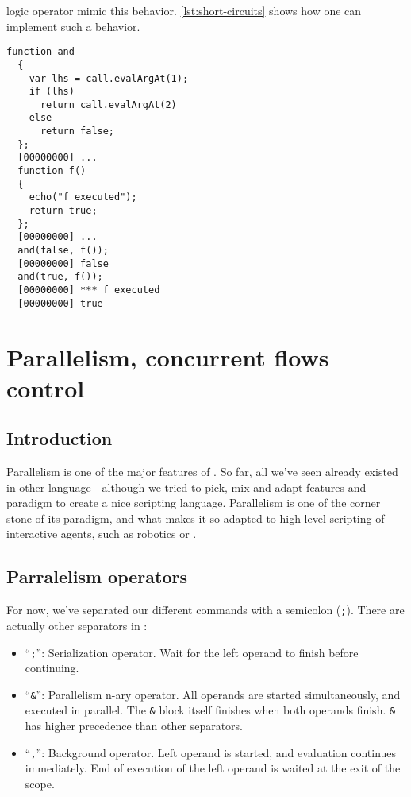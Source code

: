\documentclass[openright,twoside,12pt]{report}
\begin{document}
\urbi logic operator mimic this behavior. \autoref{lst:short-circuits} shows
how one can implement such a behavior.

\begin{lstlisting}[caption=Implementing logic short circuits,
  label=lst:short-circuits]
  function and
  {
    var lhs = call.evalArgAt(1);
    if (lhs)
      return call.evalArgAt(2)
    else
      return false;
  };
  [00000000] ...
  function f()
  {
    echo("f executed");
    return true;
  };
  [00000000] ...
  and(false, f());
  [00000000] false
  and(true, f());
  [00000000] *** f executed
  [00000000] true
\end{lstlisting}


\chapter{Parallelism, concurrent flows control}

\section{Introduction}

Parallelism is one of the major features of \urbi. So far, all we've
seen already existed in other language - although we tried to pick,
mix and adapt features and paradigm to create a nice scripting
language. Parallelism is one of the corner stone of its paradigm, and
what makes it so adapted to high level scripting of interactive
agents, such as robotics or \ai.

\section{Parralelism operators}

For now, we've separated our different commands with a semicolon
(\texttt{;}). There are actually other separators in \urbi:

\begin{itemize}
\item ``\texttt{;}'': Serialization operator. Wait for the left
  operand to finish before continuing.
\item ``\texttt{\&}'': Parallelism n-ary operator. All operands are
  started simultaneously, and executed in parallel. The \texttt{\&}
  block itself finishes when both operands finish. \texttt{\&} has
  higher precedence than other separators.
\item ``\texttt{,}'': Background operator. Left operand is started,
  and evaluation continues immediately. End of execution of the left
  operand is waited at the exit of the scope.
\end{itemize}
\end{document}
